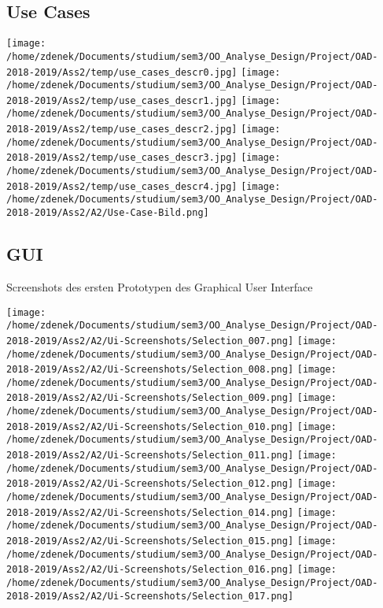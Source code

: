 \documentclass[a4paper]{article}
\begin{document}
\subsection{Use Cases}

\texttt{[image: /home/zdenek/Documents/studium/sem3/OO\_Analyse\_Design/Project/OAD-2018-2019/Ass2/temp/use\_cases\_descr0.jpg]}
\newpage
\texttt{[image: /home/zdenek/Documents/studium/sem3/OO\_Analyse\_Design/Project/OAD-2018-2019/Ass2/temp/use\_cases\_descr1.jpg]}
\newpage
\texttt{[image: /home/zdenek/Documents/studium/sem3/OO\_Analyse\_Design/Project/OAD-2018-2019/Ass2/temp/use\_cases\_descr2.jpg]}
\newpage
\texttt{[image: /home/zdenek/Documents/studium/sem3/OO\_Analyse\_Design/Project/OAD-2018-2019/Ass2/temp/use\_cases\_descr3.jpg]}
\newpage
\texttt{[image: /home/zdenek/Documents/studium/sem3/OO\_Analyse\_Design/Project/OAD-2018-2019/Ass2/temp/use\_cases\_descr4.jpg]}
\newpage
\texttt{[image: /home/zdenek/Documents/studium/sem3/OO\_Analyse\_Design/Project/OAD-2018-2019/Ass2/A2/Use-Case-Bild.png]}

\subsection{GUI}

Screenshots des ersten Prototypen des Graphical User Interface
\newline

\texttt{[image: /home/zdenek/Documents/studium/sem3/OO\_Analyse\_Design/Project/OAD-2018-2019/Ass2/A2/Ui-Screenshots/Selection\_007.png]}
\texttt{[image: /home/zdenek/Documents/studium/sem3/OO\_Analyse\_Design/Project/OAD-2018-2019/Ass2/A2/Ui-Screenshots/Selection\_008.png]}
\texttt{[image: /home/zdenek/Documents/studium/sem3/OO\_Analyse\_Design/Project/OAD-2018-2019/Ass2/A2/Ui-Screenshots/Selection\_009.png]}
\texttt{[image: /home/zdenek/Documents/studium/sem3/OO\_Analyse\_Design/Project/OAD-2018-2019/Ass2/A2/Ui-Screenshots/Selection\_010.png]}
\texttt{[image: /home/zdenek/Documents/studium/sem3/OO\_Analyse\_Design/Project/OAD-2018-2019/Ass2/A2/Ui-Screenshots/Selection\_011.png]}
\texttt{[image: /home/zdenek/Documents/studium/sem3/OO\_Analyse\_Design/Project/OAD-2018-2019/Ass2/A2/Ui-Screenshots/Selection\_012.png]}
\texttt{[image: /home/zdenek/Documents/studium/sem3/OO\_Analyse\_Design/Project/OAD-2018-2019/Ass2/A2/Ui-Screenshots/Selection\_014.png]}
\texttt{[image: /home/zdenek/Documents/studium/sem3/OO\_Analyse\_Design/Project/OAD-2018-2019/Ass2/A2/Ui-Screenshots/Selection\_015.png]}
\texttt{[image: /home/zdenek/Documents/studium/sem3/OO\_Analyse\_Design/Project/OAD-2018-2019/Ass2/A2/Ui-Screenshots/Selection\_016.png]}
\texttt{[image: /home/zdenek/Documents/studium/sem3/OO\_Analyse\_Design/Project/OAD-2018-2019/Ass2/A2/Ui-Screenshots/Selection\_017.png]}
\end{document}
